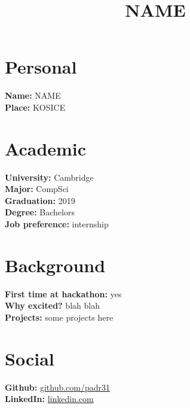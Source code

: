 \documentclass{article}
\title{NAME}
\date{}
\begin{document}
\maketitle

\section*{Personal}
\textbf{Name: } NAME\\
\textbf{Place:} KOSICE\\

\section*{Academic} 
\textbf{University:} Cambridge\\
\textbf{Major:} CompSci\\
\textbf{Graduation:} 2019\\
\textbf{Degree:} Bachelors\\
\textbf{Job preference:} internship\\

\section*{Background}
\textbf{First time at hackathon:} yes\\
\textbf{Why excited?} blah blah\\
\textbf{Projects:} some projects here\\

\section*{Social}
\textbf{Github:} \href{github.com/padr31}{github.com/padr31}\\
\textbf{LinkedIn:} \href{linkedin.com}{linkedin.com}
\end{document}
